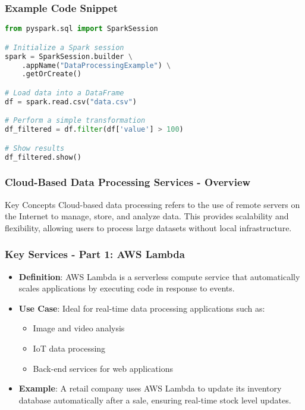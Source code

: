 \documentclass[aspectratio=169]{beamer}
\begin{document}
\begin{frame}[fragile]
    \frametitle{Example Code Snippet}
    \begin{lstlisting}[language=Python]
from pyspark.sql import SparkSession

# Initialize a Spark session
spark = SparkSession.builder \
    .appName("DataProcessingExample") \
    .getOrCreate()

# Load data into a DataFrame
df = spark.read.csv("data.csv")

# Perform a simple transformation
df_filtered = df.filter(df['value'] > 100)

# Show results
df_filtered.show()
    \end{lstlisting}
\end{frame}

\begin{frame}[fragile]
    \frametitle{Cloud-Based Data Processing Services - Overview}
    \begin{block}{Key Concepts}
        Cloud-based data processing refers to the use of remote servers on the Internet to manage, store, and analyze data. This provides scalability and flexibility, allowing users to process large datasets without local infrastructure.
    \end{block}
\end{frame}

\begin{frame}[fragile]
    \frametitle{Key Services - Part 1: AWS Lambda}
    \begin{itemize}
        \item \textbf{Definition}: AWS Lambda is a serverless compute service that automatically scales applications by executing code in response to events.
        \item \textbf{Use Case}: Ideal for real-time data processing applications such as:
        \begin{itemize}
            \item Image and video analysis
            \item IoT data processing
            \item Back-end services for web applications
        \end{itemize}
        \item \textbf{Example}: A retail company uses AWS Lambda to update its inventory database automatically after a sale, ensuring real-time stock level updates.
    \end{itemize}
\end{frame}
\end{document}
